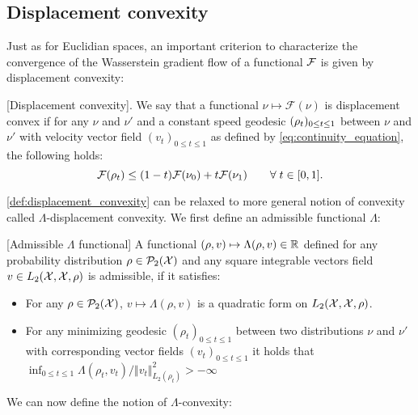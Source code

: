\subsection{Displacement convexity}\label{subsec:lambda_convexity}
Just as for Euclidian spaces, an  important criterion to characterize the convergence of the Wasserstein gradient flow of a functional ${{\mathcal F}}$ is given by displacement convexity:
\begin{definition}\label{def:displacement_convexity}[Displacement convexity]. 
We say that a functional $\nu\mapsto\mathcal{F}(\nu)$ is displacement convex
	if for any $\nu$ and $\nu'$ and a constant speed geodesic $(\text{\ensuremath{\rho_{t}}})_{0 \le t \le 1}$
	between $\nu$ and $\nu'$ with velocity vector field $(v_{t})_{0 \le t \le 1}$ as defined by \cref{eq:continuity_equation},
	the following holds:
	\begin{equation}\label{eq:lambda_displacement_convex}
		{{\mathcal F}}(\rho_{t})\leq(1-t){{\mathcal F}}(\nu_{0})+t{{\mathcal F}}(\nu_{1}) \qquad\forall\; t\in[0,1].
	\end{equation}
\end{definition}
\cref{def:displacement_convexity} can be relaxed to more general notion of convexity called $\Lambda$-displacement convexity. We first define an admissible functional $\Lambda$:
\begin{definition}\label{def:conditions_lambda}[Admissible $\Lambda$ functional]
	A functional $(\rho,v)\mapsto \Lambda(\rho,v) \in {{\mathbb R}}$  defined for any probability distribution $\rho\in \mathcal{P}_2({{\mathcal X}})$ and any square integrable vectors field $v\in L_2({{\mathcal X}},{{\mathcal X}},\rho)$ is admissible, if it satisfies:
	\begin{itemize}
	\item For any $\rho \in \mathcal{P}_2({{\mathcal X}})$,  $v\mapsto \Lambda(\rho,v)$ is a quadratic form on $L_2({{\mathcal X}},{{\mathcal X}},\rho)$.
	\item For any minimizing geodesic $(\rho_t)_{0\leq t\leq 1}$ between two distributions $\nu$ and $\nu'$ with corresponding vector fields $(v_t)_{0\leq t\leq 1}$ it holds that $\inf_{0\leq t\leq 1}\Lambda(\rho_t,v_t)/\Vert v_t\Vert_{L_{2}(\rho_t)}^{2}>-\infty$ 
\end{itemize}
\end{definition}
We can now define the notion of $\Lambda$-convexity:
